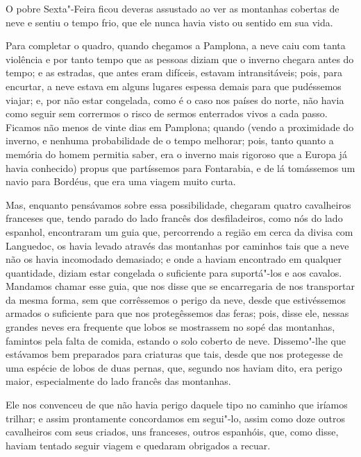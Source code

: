 O pobre Sexta"-Feira ficou deveras assustado ao ver as montanhas cobertas
de neve e sentiu o tempo frio, que ele nunca havia visto ou sentido em
sua vida.

Para completar o quadro, quando chegamos a Pamplona, a neve caiu com
tanta violência e por tanto tempo que as pessoas diziam que o inverno
chegara antes do tempo; e as estradas, que antes eram difíceis, estavam
intransitáveis; pois, para encurtar, a neve estava em alguns lugares
espessa demais para que pudéssemos viajar; e, por não estar congelada,
como é o caso nos países do norte, não havia como seguir sem corrermos o
risco de sermos enterrados vivos a cada passo. Ficamos não menos de
vinte dias em Pamplona; quando (vendo a proximidade do inverno, e
nenhuma probabilidade de o tempo melhorar; pois, tanto quanto a memória
do homem permitia saber, era o inverno mais rigoroso que a Europa já
havia conhecido) propus que partíssemos para Fontarabia, e de lá
tomássemos um navio para Bordéus, que era uma viagem muito curta.

Mas, enquanto pensávamos sobre essa possibilidade, chegaram quatro
cavalheiros franceses que, tendo parado do lado francês dos
desfiladeiros, como nós do lado espanhol, encontraram um guia que,
percorrendo a região em cerca da divisa com Languedoc, os havia levado
através das montanhas por caminhos tais que a neve não os havia
incomodado demasiado; e onde a haviam encontrado em qualquer quantidade,
diziam estar congelada o suficiente para suportá"-los e aos cavalos.
Mandamos chamar esse guia, que nos disse que se encarregaria de nos
transportar da mesma forma, sem que corrêssemos o perigo da neve, desde
que estivéssemos armados o suficiente para que nos protegêssemos das
feras; pois, disse ele, nessas grandes neves era frequente que lobos se
mostrassem no sopé das montanhas, famintos pela falta de comida, estando
o solo coberto de neve. Dissemo"-lhe que estávamos bem preparados para
criaturas que tais, desde que nos protegesse de uma espécie de lobos de
duas pernas, que, segundo nos haviam dito, era perigo maior,
especialmente do lado francês das montanhas.

Ele nos convenceu de que não havia perigo daquele tipo no caminho que
iríamos trilhar; e assim prontamente concordamos em segui"-lo, assim como
doze outros cavalheiros com seus criados, uns franceses, outros
espanhóis, que, como disse, haviam tentado seguir viagem e quedaram
obrigados a recuar.

